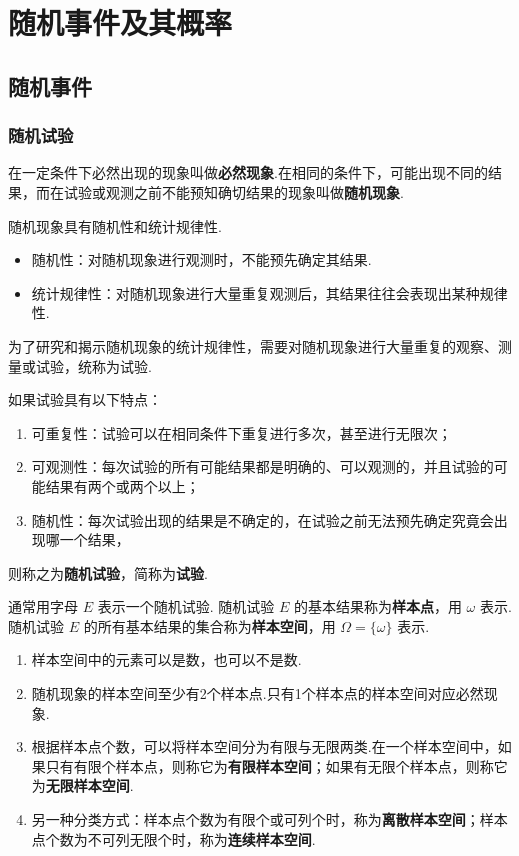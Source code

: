 
\chapter{随机事件及其概率}

\section{随机事件}

\subsection{随机试验}

在一定条件下必然出现的现象叫做\textbf{必然现象}.在相同的条件下，可能出现不同的结果，而在试验或观测之前不能预知确切结果的现象叫做\textbf{随机现象}.

随机现象具有随机性和统计规律性.

\begin{itemize}
    \item 随机性：对随机现象进行观测时，不能预先确定其结果.
    \item 统计规律性：对随机现象进行大量重复观测后，其结果往往会表现出某种规律性.
\end{itemize}

为了研究和揭示随机现象的统计规律性，需要对随机现象进行大量重复的观察、测量或试验，统称为试验.

如果试验具有以下特点：
\begin{enumerate}
    \item 可重复性：试验可以在相同条件下重复进行多次，甚至进行无限次；
    \item 可观测性：每次试验的所有可能结果都是明确的、可以观测的，并且试验的可能结果有两个或两个以上；
    \item 随机性：每次试验出现的结果是不确定的，在试验之前无法预先确定究竟会出现哪一个结果，
\end{enumerate}
则称之为\textbf{随机试验}，简称为\textbf{试验}.

通常用字母 $E$ 表示一个随机试验. 随机试验 $E$ 的基本结果称为\textbf{样本点}，用 $\omega$ 表示.随机试验 $E$ 的所有基本结果的集合称为\textbf{样本空间}，用 $\varOmega = \{ \omega \}$ 表示.

\begin{note}
    \begin{enumerate}
        \item 样本空间中的元素可以是数，也可以不是数.
        \item 随机现象的样本空间至少有2个样本点.只有1个样本点的样本空间对应必然现象.
        \item 根据样本点个数，可以将样本空间分为有限与无限两类.在一个样本空间中，如果只有有限个样本点，则称它为\textbf{有限样本空间}；如果有无限个样本点，则称它为\textbf{无限样本空间}.
        \item 另一种分类方式：样本点个数为有限个或可列个时，称为\textbf{离散样本空间}；样本点个数为不可列无限个时，称为\textbf{连续样本空间}.
    \end{enumerate}
\end{note}

